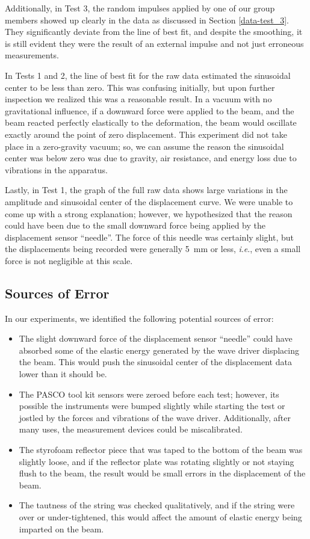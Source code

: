 \documentclass[12 pt]{report}
\newcommand{\ie}{\textit{i}.\textit{e}., }
\begin{document}
Additionally, in Test \num{3}, the random impulses applied by one of our group members showed up clearly in the data as discussed in Section \ref{data-test_3}. They significantly deviate from the line of best fit, and despite the smoothing, it is still evident they were the result of an external impulse and not just erroneous measurements.

In Tests \num{1} and \num{2}, the line of best fit for the raw data estimated the sinusoidal center to be less than zero. This was confusing initially, but upon further inspection we realized this was a reasonable result. In a vacuum with no gravitational influence, if a downward force were applied to the beam, and the beam reacted perfectly elastically to the deformation, the beam would oscillate exactly around the point of zero displacement. This experiment did not take place in a zero-gravity vacuum; so, we can assume the reason the sinusoidal center was below zero was due to gravity, air resistance, and energy loss due to vibrations in the apparatus.

Lastly, in Test \num{1}, the graph of the full raw data shows large variations in the amplitude and sinusoidal center of the displacement curve. We were unable to come up with a strong explanation; however, we hypothesized that the reason could have been due to the small downward force being applied by the displacement sensor ``needle''. The force of this needle was certainly slight, but the displacements being recorded were generally \qty{5}{\mm} or less, \ie even a small force is not negligible at this scale.

\subsection{Sources of Error} \label{analysis-sources_of_error}
In our experiments, we identified the following potential sources of error:

\begin{itemize}
	\item The slight downward force of the displacement sensor ``needle'' could have absorbed some of the elastic energy generated by the wave driver displacing the beam. This would push the sinusoidal center of the displacement data lower than it should be.
	\item The PASCO tool kit sensors were zeroed before each test; however, its possible the instruments were bumped slightly while starting the test or jostled by the forces and vibrations of the wave driver. Additionally, after many uses, the measurement devices could be miscalibrated.
	\item The styrofoam reflector piece that was taped to the bottom of the beam was slightly loose, and if the reflector plate was rotating slightly or not staying flush to the beam, the result would be small errors in the displacement of the beam.
	\item The tautness of the string was checked qualitatively, and if the string were over or under-tightened, this would affect the amount of elastic energy being imparted on the beam.
\end{itemize}
\end{document}
